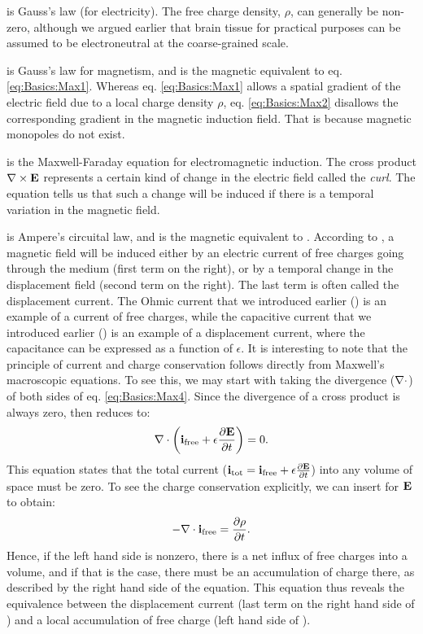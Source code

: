  is Gauss's law (for electricity). The free charge density, $\rho$, can generally be non-zero, although we argued earlier that brain tissue for practical purposes can be assumed to be electroneutral at the coarse-grained scale.

 is Gauss's law for magnetism, and is the magnetic equivalent to eq. \ref{eq:Basics:Max1}. Whereas eq. \ref{eq:Basics:Max1} allows a spatial gradient of the electric field due to a local charge density $\rho$, eq. \ref{eq:Basics:Max2} disallows the corresponding gradient in the magnetic induction field. That is because magnetic monopoles do not exist. 

 is the Maxwell-Faraday equation for electromagnetic induction. The cross product ${\bf \nabla} \times {\bf E}$ represents a certain kind of change in the electric field called the \textit{curl}. The equation tells us that such a change will be induced if there is a temporal variation in the magnetic field.

 is Ampere's circuital law, and is the magnetic equivalent to . According to , a magnetic field will be induced either by an electric current of free charges going through the medium (first term on the right), or by a temporal change in the displacement field (second term on the right). The last term is often called the displacement current. The Ohmic current that we introduced earlier () is an example of a current of free charges, while the capacitive current that we introduced earlier () is an example of a displacement current, where the capacitance can be expressed as a function of $\epsilon$.
%
It is interesting to note that the principle of current and charge conservation follows directly from Maxwell's macroscopic equations. To see this, we may start with taking the divergence (${\bf \nabla} \cdot$) of both sides of eq. \ref{eq:Basics:Max4}. Since the divergence of a cross product is always zero,  then reduces to:
\begin{equation}
{\bf \nabla} \cdot \left( {\bf i}_\text{free} +  \epsilon \frac{\partial {\bf E}}{\partial t} \right) = 0.
\label{eq:Basics:Max4dot}
\end{equation}
This equation states that the total current (${\bf i}_\text{tot} = {\bf i}_\text{free} +  \epsilon \frac{\partial {\bf E}}{\partial t}$) into any volume of space must be zero. To see the charge conservation explicitly, we can insert  for ${\bf E}$ to obtain:
\begin{equation}
- {\bf \nabla} \cdot {\bf i}_\text{free} =  \frac{\partial \rho}{\partial t}.
\label{eq:Basics:currentconservation}
\end{equation}
Hence, if the left hand side is nonzero, there is a net influx of free charges into a volume, and if that is the case, there must be an accumulation of charge there, as described by the right hand side of the equation. This equation thus reveals the equivalence between the displacement current (last term on the right hand side of ) and a local accumulation of free charge (left hand side of ).


